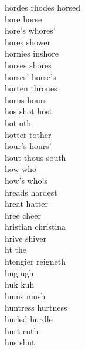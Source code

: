 hordes rhodes horsed\\
hore horse \\
hore's whores' \\
hores shower \\
hornies inshore\\
horses shores\\
horses' horse's\\
horten thrones \\
horus hours\\
hos shot host \\
hot oth\\
hotter tother\\
hour's hours'\\
hout thous south \\
how who\\
how's who's\\
hreads hardest \\
hreat hatter \\
hree cheer \\
hristian christina \\
hrive shiver \\
ht the \\
htengier reigneth\\
hug ugh\\
huk kuh\\
hums mush\\
huntress hurtness\\
hurled hurdle\\
hurt ruth\\
hus shut \\

